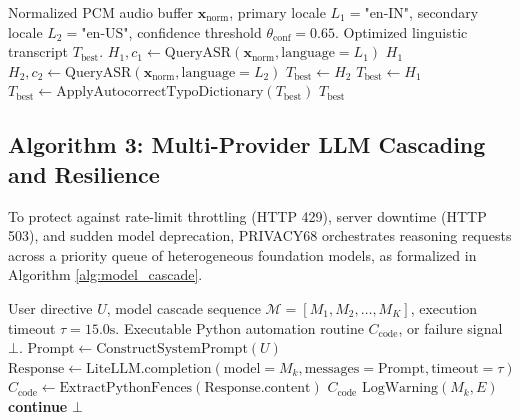 \begin{algorithm}[htbp]
\caption{Dual-Pass Dialect Fallback and Hypothesis Rescue}
\label{alg:dialect_rescue}
\begin{algorithmic}[1]
\Require Normalized PCM audio buffer $\mathbf{x}_{\text{norm}}$, primary locale $L_1 = \text{"en-IN"}$, secondary locale $L_2 = \text{"en-US"}$, confidence threshold $\theta_{\text{conf}} = 0.65$.
\Ensure Optimized linguistic transcript $T_{\text{best}}$.
\State $H_1, c_1 \gets \text{QueryASR}(\mathbf{x}_{\text{norm}}, \text{language}=L_1)$ 
    \State \Return $H_1$
\EndIf
\State $H_2, c_2 \gets \text{QueryASR}(\mathbf{x}_{\text{norm}}, \text{language}=L_2)$ 
    \State $T_{\text{best}} \gets H_2$
\Else
    \State $T_{\text{best}} \gets H_1$
\EndIf
\State $T_{\text{best}} \gets \text{ApplyAutocorrectTypoDictionary}(T_{\text{best}})$ 
\State \Return $T_{\text{best}}$
\end{algorithmic}
\end{algorithm}

\subsection{Algorithm 3: Multi-Provider LLM Cascading and Resilience}
To protect against rate-limit throttling (HTTP 429), server downtime (HTTP 503), and sudden model deprecation, PRIVACY68 orchestrates reasoning requests across a priority queue of heterogeneous foundation models, as formalized in Algorithm \ref{alg:model_cascade}.

\begin{algorithm}[htbp]
\caption{Multi-Provider LLM Cascading and Resilience}
\label{alg:model_cascade}
\begin{algorithmic}[1]
\Require User directive $U$, model cascade sequence $\mathcal{M} = [M_1, M_2, \dots, M_K]$, execution timeout $\tau = 15.0\text{s}$.
\Ensure Executable Python automation routine $C_{\text{code}}$, or failure signal $\bot$.
    \Try
        \State $\text{Prompt} \gets \text{ConstructSystemPrompt}(U)$
        \State $\text{Response} \gets \text{LiteLLM.completion}(\text{model}=M_k, \text{messages}=\text{Prompt}, \text{timeout}=\tau)$
        \State $C_{\text{code}} \gets \text{ExtractPythonFences}(\text{Response.content})$
            \State \Return $C_{\text{code}}$
        \EndIf
        \State $\text{LogWarning}(M_k, E)$
        \State \textbf{continue} 
    \EndTry
\EndFor
\State \Return $\bot$ 
\end{algorithmic}
\end{algorithm}

